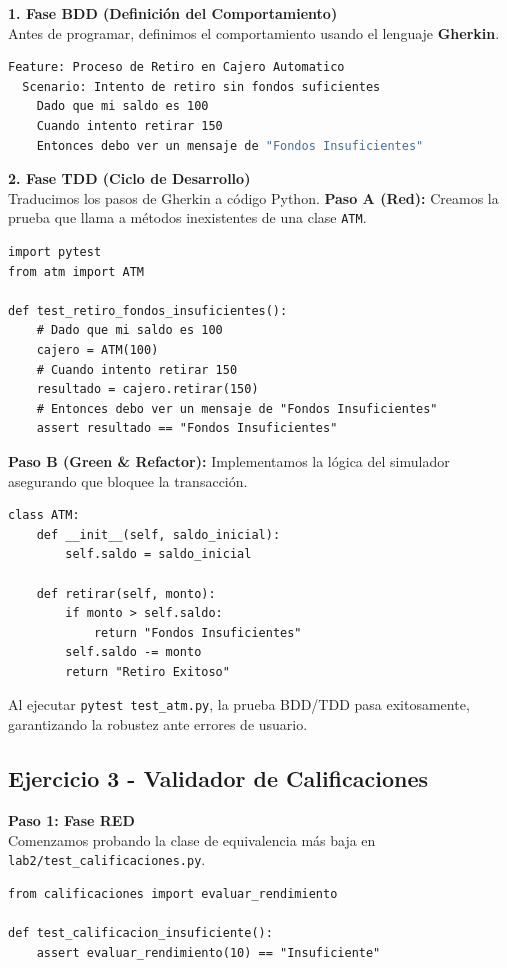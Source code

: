 \documentclass{article}
\begin{document}
\textbf{1. Fase BDD (Definición del Comportamiento)} \\
Antes de programar, definimos el comportamiento usando el lenguaje \textbf{Gherkin}.
\begin{lstlisting}[language=bash, caption={lab2/atm.feature}]
Feature: Proceso de Retiro en Cajero Automatico
  Scenario: Intento de retiro sin fondos suficientes
    Dado que mi saldo es 100
    Cuando intento retirar 150
    Entonces debo ver un mensaje de "Fondos Insuficientes"
\end{lstlisting}

\textbf{2. Fase TDD (Ciclo de Desarrollo)} \\
Traducimos los pasos de Gherkin a código Python.
\textbf{Paso A (Red):} Creamos la prueba que llama a métodos inexistentes de una clase \texttt{ATM}.
\begin{lstlisting}[caption={lab2/test\_atm.py (Fase RED)}]
import pytest
from atm import ATM

def test_retiro_fondos_insuficientes():
    # Dado que mi saldo es 100
    cajero = ATM(100)
    # Cuando intento retirar 150
    resultado = cajero.retirar(150)
    # Entonces debo ver un mensaje de "Fondos Insuficientes"
    assert resultado == "Fondos Insuficientes"
\end{lstlisting}

\textbf{Paso B (Green \& Refactor):} Implementamos la lógica del simulador asegurando que bloquee la transacción.
\begin{lstlisting}[caption={lab2/atm.py (Fase GREEN/REFACTOR)}]
class ATM:
    def __init__(self, saldo_inicial):
        self.saldo = saldo_inicial
    
    def retirar(self, monto):
        if monto > self.saldo:
            return "Fondos Insuficientes"
        self.saldo -= monto
        return "Retiro Exitoso"
\end{lstlisting}
Al ejecutar \texttt{pytest test\_atm.py}, la prueba BDD/TDD pasa exitosamente, garantizando la robustez ante errores de usuario.

\subsection{Ejercicio 3 - Validador de Calificaciones}

\textbf{Paso 1: Fase RED} \\
Comenzamos probando la clase de equivalencia más baja en \texttt{lab2/test\_calificaciones.py}.
\begin{lstlisting}[caption={lab2/test\_calificaciones.py (Fase RED)}]
from calificaciones import evaluar_rendimiento

def test_calificacion_insuficiente():
    assert evaluar_rendimiento(10) == "Insuficiente"
\end{lstlisting}
\end{document}
